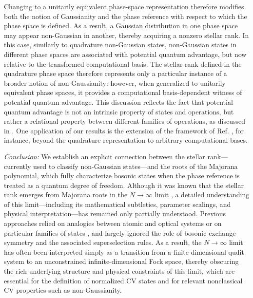 \documentclass[aps,prl,showpacs,twocolumn]{revtex4-2}
\begin{document}
Changing to a unitarily equivalent phase-space representation therefore modifies both the notion of Gaussianity and the phase reference with respect to which the phase space is defined.  As a result, a Gaussian distribution in one phase space may appear non-Gaussian in another, thereby acquiring a nonzero stellar rank. In this case, similarly to quadrature non-Gaussian states, non-Gaussian states in different phase spaces are associated with potential quantum advantage, but now relative to the transformed computational basis. The stellar rank defined in the quadrature phase space therefore represents only a particular instance of a broader notion of non-Gaussianity: however, when generalized to unitarily equivalent phase spaces, it provides a computational basis-dependent witness of potential quantum advantage. This discussion reflects the fact that potential quantum advantage is not an intrinsic property of states and operations, but rather a relational property between different families of operations, as discussed in \cite{Wagner:2025fmv,descamps2025unifiedframeworkbosonicquantum,descamps2025HW}. One application of our results is the extension of the framework of Ref. \cite{PhysRevLett.130.090602}, for instance, beyond the quadrature representation to arbitrary computational bases.





{\it Conclusion:}  We establish an explicit connection between the stellar rank—currently used to classify non-Gaussian states—and the roots of the Majorana polynomial, which fully characterize bosonic states when the phase reference is treated as a quantum degree of freedom. Although it was known that the stellar rank emerges from Majorana roots in the $N \to \infty$ limit \cite{UlysseHolo}, a detailed understanding of this limit—including its mathematical subtleties, parameter scalings, and physical interpretation—has remained only partially understood. Previous approaches relied on analogies between atomic and optical systems \cite{RevModPhys.90.035005} or on particular families of states \cite{PhysRevA.6.2211,PhysRevA.68.033821}, and largely ignored the role of bosonic exchange symmetry and the associated superselection rules. As a result, the $N \to \infty$ limit has often been interpreted simply as a transition from a finite-dimensional qudit system to an unconstrained infinite-dimensional Fock space, thereby obscuring the rich underlying structure and physical constraints of this limit, which are essential for the definition of normalized CV states and for relevant nonclassical CV properties such as non-Gaussianity.
\end{document}
